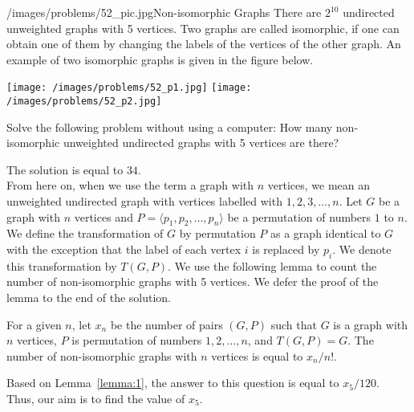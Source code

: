 \begin{problem}{/images/problems/52_pic.jpg}{Non-isomorphic Graphs}  There are $2^{10}$ undirected unweighted graphs with 5 vertices. Two graphs are called isomorphic, if one can obtain one of them by changing the labels of the vertices of the other graph. An example of two isomorphic graphs is given in the figure below.

\begin{center}
	\texttt{[image: /images/problems/52\_p1.jpg]}	\texttt{[image: /images/problems/52\_p2.jpg]}
\end{center}	

Solve the following problem without using a computer: How many non-isomorphic unweighted undirected graphs with 5 vertices are there?
\end{problem}
\begin{solution}
The solution is equal to $34$.\\[0.2cm]

From here on, when we use the term a graph with $n$ vertices, we mean an unweighted undirected graph with vertices labelled with $1, 2, 3, \ldots, n$. Let $G$ be a graph with $n$ vertices and $P = \langle p_1, p_2, \ldots, p_n \rangle$ be a permutation of numbers $1$ to $n$. We define the transformation of $G$ by permutation $P$ as a graph identical to $G$ with the exception that the label of each vertex $i$ is replaced by $p_i$. We denote this transformation by $T(G, P)$.
We use the following lemma to count the number of non-isomorphic graphs with 5 vertices. We defer the proof of the lemma to the end of the solution.
\begin{lemma}\label{lemma:1}
	For a given $n$, let $x_n$ be the number of pairs $(G, P)$ such that $G$ is a graph with $n$ vertices, $P$ is  permutation of numbers $1,2, \ldots, n$, and $T(G, P) = G$. The number of non-isomorphic graphs with $n$ vertices is equal to $x_n/n!$.
\end{lemma}


Based on Lemma~\ref{lemma:1}, the answer to this question is equal to $x_5 / 120$. Thus, our aim is to find the value of $x_5$.\\[0.2cm]


\end{solution}
